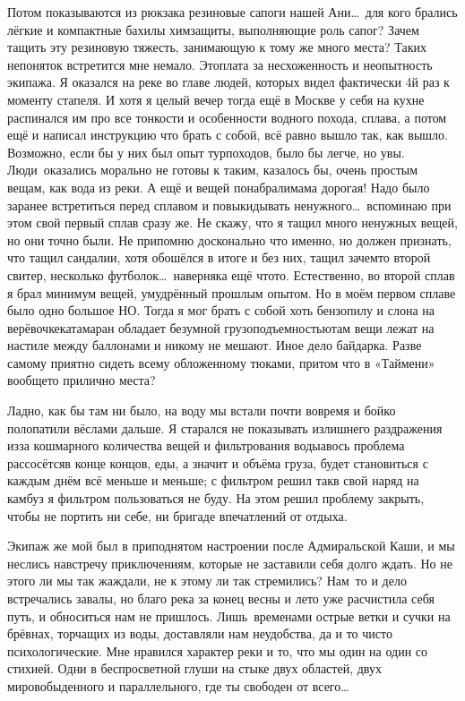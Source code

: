 Потом показываются из рюкзака резиновые сапоги нашей Ани\ldots~для кого брались лёгкие и компактные бахилы химзащиты, выполняющие роль сапог? Зачем тащить эту резиновую тяжесть, занимающую к тому же много места? Таких непоняток встретится мне немало. Это\mdash плата за несхоженность и неопытность экипажа. Я оказался на реке во главе людей, которых видел фактически 4\sdash й раз к моменту стапеля. И хотя я целый вечер тогда ещё в Москве у себя на кухне распинался им про все тонкости и особенности водного похода, сплава, а потом ещё и написал инструкцию что брать с собой, всё равно вышло так, как вышло. Возможно, если бы у них был опыт турпоходов, было бы легче, но увы. Люди~оказались морально не готовы к таким, казалось бы, очень простым вещам, как вода из реки. А ещё и вещей понабрали\mdash мама дорогая! Надо было заранее встретиться перед сплавом и повыкидывать ненужного\ldots~вспоминаю при этом свой первый сплав сразу же. Не скажу, что я тащил много ненужных вещей, но они точно были. Не припомню досконально что именно, но должен признать, что тащил сандалии, хотя обошёлся в итоге и без них, тащил зачем\sdash то второй свитер, несколько футболок\ldots~наверняка ещё что\sdash то. Естественно, во второй сплав я брал минимум вещей, умудрённый прошлым опытом. Но в моём первом сплаве было одно большое НО. Тогда я мог брать с собой хоть бензопилу и слона на верёвочке\mdash катамаран обладает безумной грузоподъемностью\mdash там вещи лежат на настиле между баллонами и никому не мешают. Иное дело байдарка. Разве самому приятно сидеть всему обложенному тюками, притом что в «Таймени» вообще\sdash то прилично места? 

Ладно, как бы там ни было, на воду мы встали почти вовремя и бойко полопатили вёслами дальше. Я старался не показывать излишнего раздражения из\sdash за кошмарного количества вещей и фильтрования воды\mdash авось проблема рассосётся\mdash в конце концов, еды, а значит и объёма груза, будет становиться с каждым днём всё меньше и меньше; с фильтром решил так\mdash в свой наряд на камбуз я фильтром пользоваться не буду. На этом решил проблему закрыть, чтобы не портить ни себе, ни бригаде впечатлений от отдыха.

Экипаж же мой был в приподнятом настроении после Адмиральской Каши, и мы неслись навстречу приключениям, которые не заставили себя долго ждать. Но не этого ли мы так жаждали, не к этому ли так стремились? Нам~то и дело встречались завалы, но благо река за конец весны и лето уже расчистила себя путь, и обноситься нам не пришлось. Лишь~временами острые ветки и сучки на брёвнах, торчащих из воды, доставляли нам неудобства, да и то чисто психологические. Мне нравился характер реки и то, что мы один на один со стихией. Одни в беспросветной глуши на стыке двух областей, двух миров\mdash обыденного и параллельного, где ты свободен от всего\ldots~

